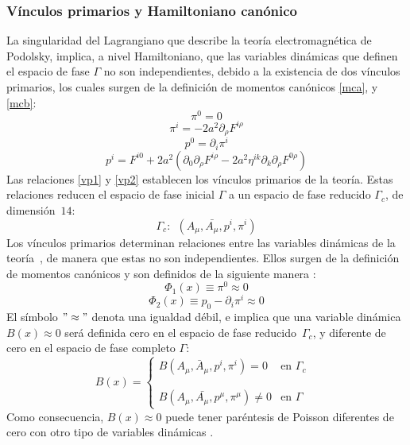\documentclass[a4paper,12pt]{article}
\begin{document}
\subsubsection{Vínculos primarios y Hamiltoniano canónico}
La singularidad del Lagrangiano que describe la teoría electromagnética de Podolsky, implica, a nivel Hamiltoniano, que las variables dinámicas que definen el espacio de fase $\Gamma$ no son independientes, debido a la existencia de dos vínculos primarios, los cuales surgen de la definición de momentos canónicos \eqref{mca}, y \eqref{mcb}:
\begin{equation}
\pi^0=0   
\label{vp1}
\end{equation}
\begin{equation}
 \pi^i=-2a^2\partial_\rho F^{i\rho}  
\label{desapp}
\end{equation}
\begin{equation}
p^0=\partial_i \pi^i     
\label{vp2}
\end{equation}
\begin{equation}
p^i=F^{i0}+2a^2(\partial_0\partial_\rho F^{i\rho}-2a^2\eta^{ik}\partial_k\partial_\rho F^{0\rho}) 
\end{equation}
Las relaciones \eqref{vp1} y \eqref{vp2} establecen los vínculos primarios de la teoría. Estas relaciones reducen el espacio de fase inicial $\Gamma$ a un espacio de fase reducido $\Gamma_c$, de \mbox{dimensión $14$:}
\begin{equation}
\Gamma_c: \ \ (A_\mu,\bar{A_\mu},p^i,\pi^i) 
\end{equation}
Los vínculos primarios determinan relaciones entre las variables dinámicas de la \mbox{teoría \cite{dirac,puebla,Merilin},} de manera que estas no son independientes. Ellos surgen de la \mbox{definición} de momentos canónicos y son definidos de la siguiente manera \cite{podolsky,forhaljdpo}:
\begin{equation}
\Phi_1(x)\equiv \pi^0\approx0  
\label{Pu} 
\end{equation}
$$\Phi_2(x)\equiv p_0-\partial_i\pi^i\approx0 $$  
El símbolo \mbox{$"\approx"$} denota una igualdad débil, e implica que una variable \mbox{dinámica $B(x)\approx0$} será definida cero en el espacio de fase \mbox{reducido $\Gamma_c$,} y diferente de cero en el espacio de fase completo $\Gamma$:
\begin{equation}
B(x)=\left\{ \begin{array}{lcl}
B(A_\mu,\bar{A}_\mu,p^i,\pi^i)=0 & \mbox{en $\Gamma_c$ }\\
&
\\
\\
B(A_\mu,\bar{A_\mu},p^\mu,\pi^\mu)\neq0 & \mbox{en $\Gamma$ } 
\end{array}
\right.
\end{equation}
Como consecuencia, $B(x)\approx0$ puede tener paréntesis de Poisson diferentes de cero con otro tipo de variables dinámicas \cite{dirac,puebla,Merilin}. 
\\
\end{document}
